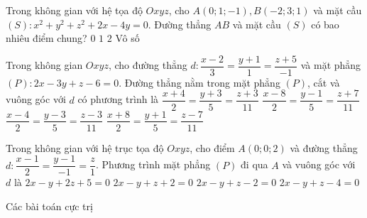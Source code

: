 	\begin{ex}%
	Trong không gian với hệ tọa độ $Oxyz$, cho $A(0;1;-1), B(-2;3;1)$ và mặt cầu $(S)\colon x^2+y^2+z^2+2x-4y=0$. Đường thẳng $AB$ và mặt cầu $(S)$ có bao nhiêu điểm chung?
	\choice
	{$0$}
	{$1$}
	{\True $2$}
	{Vô số}
	\end{ex}
	\begin{ex}%
	Trong không gian $Oxyz$, cho đường thẳng $d\colon\dfrac{x-2}{3}=\dfrac{y+1}{1}=\dfrac{z+5}{-1}$ và mặt phẳng $(P)\colon2x-3y+z-6=0$. Đường thẳng nằm trong mặt phẳng $(P)$, cắt và vuông góc với $d$ có phương trình là
	\choice
	{$\dfrac{x+4}{2}=\dfrac{y+3}{5}=\dfrac{z+3}{11}$}
	{\True $\dfrac{x-8}{2}=\dfrac{y-1}{5}=\dfrac{z+7}{11}$}
	{$\dfrac{x-4}{2}=\dfrac{y-3}{5}=\dfrac{z-3}{11}$}
	{$\dfrac{x+8}{2}=\dfrac{y+1}{5}=\dfrac{z-7}{11}$}
	\end{ex}
	\begin{ex}%
	Trong không gian với hệ trục tọa độ $Oxyz$, cho điểm $A(0;0;2)$ và đường thẳng $d\colon \dfrac{x-1}{2}=\dfrac{y-1}{-1}=\dfrac{z}{1}$. Phương trình mặt phẳng $(P)$ đi qua $A$ và vuông góc với $d$ là
	\choice
	{$2x-y+2z+5=0$}
	{$2x-y+z+2=0$}
	{\True $2x-y+z-2=0$}
	{$2x-y+z-4=0$}
	\end{ex}
	\begin{dang}{Các bài toán cực trị}
	\end{dang}
\setcounter{subsubsection}{0}
\setcounter{vd}{0}
\setcounter{ex}{0}
